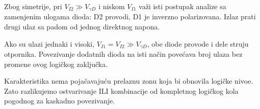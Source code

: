 Zbog simetrije, pri $V_{I2}\gg V_{\gamma D}$ i niskom $V_{I1}$ važi isti postupak analize sa zamenjenim ulogama dioda: D2 provodi, D1 je inverzno polarizovana. Izlaz prati drugi ulaz sa padom od jednog direktnog napona.

Ako su ulazi jednaki i visoki, $V_{I1}=V_{I2}\gg V_{\gamma D}$, obe diode provode i dele struju otpornika. Povezivanje dodatnih dioda na isti način povećava broj ulaza bez promene ovog logičkog zaključka.

Karakteristika nema pojačavajuću prelaznu zonu koja bi obnovila logičke nivoe. Zato razlikujemo ostvarivanje ILI kombinacije od kompletnog logičkog kola pogodnog za kaskadno povezivanje.
